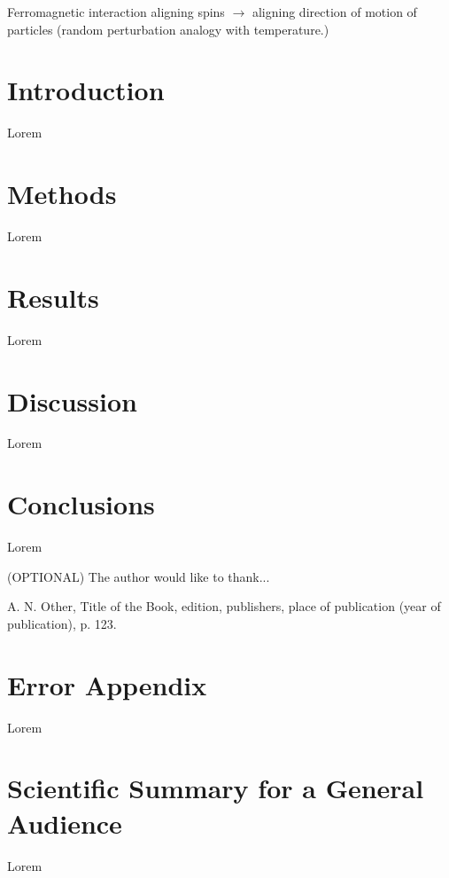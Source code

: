 \documentclass[10pt,twocolumn]{revtex4-2}    %
\begin{document}
Ferromagnetic interaction aligning spins $\rightarrow$ aligning direction of motion of particles (random perturbation analogy with temperature.)







\section{Introduction} 

Lorem 

\section{Methods} 

Lorem 
 
\section{Results} 

Lorem 
\section{Discussion} 

Lorem 


\section{Conclusions}
 
Lorem 

\begin{acknowledgments}
(OPTIONAL) The author would like to thank...
\end{acknowledgments}

\begin{thebibliography}{}

 A. N. Other, Title of the Book, edition, publishers, place of publication (year of publication), p. 123.   %


\end{thebibliography} 

\newpage

\section*{Error Appendix}
Lorem 


\clearpage

\onecolumngrid %

\section*{Scientific Summary for a General Audience}



Lorem 
\end{document}
